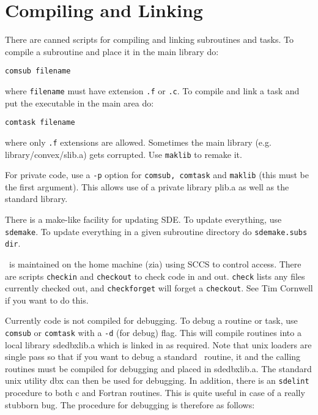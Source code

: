 \newpage
\section{Compiling and Linking}

There are canned scripts for compiling and linking subroutines and tasks.
To compile a subroutine and place it in the main library do:

{\tt comsub filename}

\noindent where {\tt filename} must have extension {\tt .f} or {\tt .c}. To 
compile and link a task and put the executable in the main area do:

{\tt comtask filename}

\noindent where only {\tt .f} extensions are allowed. Sometimes the main 
library (e.g. library/convex/slib.a) gets corrupted. Use {\tt maklib}
to remake it.

For private code, use a {\tt -p} option for {\tt comsub, comtask} and
{\tt maklib} (this must be the first argument).  This allows use of a
private library plib.a as well as the standard library.

There is a make-like facility for updating SDE. To update everything,
use {\tt sdemake}. To update everything in a given subroutine directory
do {\tt sdemake.subs dir}.

\sde\ is maintained on the home machine (zia) using SCCS to
control access. There are scripts {\tt checkin} and {\tt checkout} to
check code in and out. {\tt check} lists any files currently checked
out, and {\tt checkforget} will forget a {\tt checkout}.  See Tim
Cornwell if you want to do this.

Currently code is not compiled for debugging. To debug a routine or
task, use {\tt comsub} or {\tt comtask} with a {\tt -d} (for debug)
flag. This will compile routines into a local library sdedbxlib.a
which is linked in as required. Note that unix loaders are single pass
so that if you want to debug a standard \sde\ routine, it and the
calling routines must be compiled for debugging and placed in
sdedbxlib.a. The standard unix utility dbx can then be used for
debugging. In addition, there is an {\tt sdelint} procedure to both c
and Fortran routines. This is quite useful in case of a really
stubborn bug. The procedure for debugging is therefore as follows:

